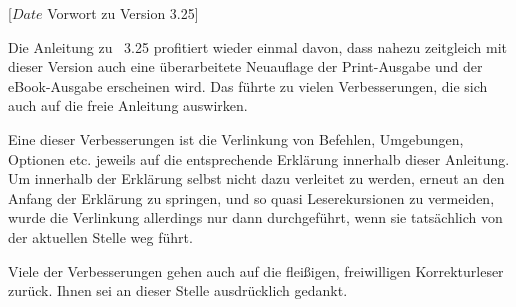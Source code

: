 %
%
%
%
%
%
%
%
%

                 [$Date$
                  Vorwort zu Version 3.25]


Die Anleitung zu \KOMAScript~3.25 profitiert wieder einmal davon, dass nahezu
zeitgleich mit dieser Version auch eine überarbeitete Neuauflage der
Print-Ausgabe \cite{book:komascript} und der eBook-Ausgabe
\cite{ebook:komascript} erscheinen wird. Das führte zu vielen Verbesserungen,
die sich auch auf die freie Anleitung auswirken.

Eine dieser Verbesserungen ist die Verlinkung von Befehlen, Umgebungen,
Optionen etc. jeweils auf die entsprechende Erklärung innerhalb dieser
Anleitung. Um innerhalb der Erklärung selbst nicht dazu verleitet zu werden,
erneut an den Anfang der Erklärung zu springen, und so quasi Leserekursionen
zu vermeiden, wurde die Verlinkung allerdings nur dann durchgeführt, wenn sie
tatsächlich von der aktuellen Stelle weg führt.

Viele der Verbesserungen gehen auch auf die fleißigen, freiwilligen
Korrekturleser zurück. Ihnen sei an dieser Stelle ausdrücklich gedankt.

